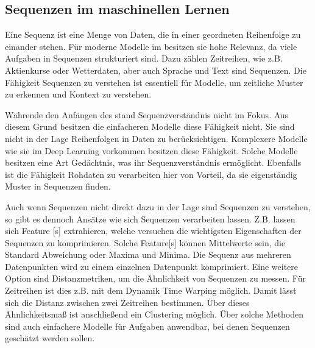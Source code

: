 \subsection{Sequenzen im maschinellen Lernen}
Eine Sequenz ist eine Menge von Daten, die in einer geordneten Reihenfolge zu einander stehen. Für moderne Modelle im  besitzen sie hohe Relevanz, da viele Aufgaben in Sequenzen strukturiert sind. Dazu zählen Zeitreihen, wie z.B. Aktienkurse oder Wetterdaten, aber auch Sprache und Text sind Sequenzen. Die Fähigkeit Sequenzen zu verstehen ist essentiell für Modelle, um zeitliche Muster zu erkennen und Kontext zu verstehen. \par

Währende den Anfängen des  stand Sequenzverständnis nicht im Fokus. Aus diesem Grund besitzen die einfacheren Modelle diese Fähigkeit nicht. Sie sind nicht in der Lage Reihenfolgen in Daten zu berücksichtigen. Komplexere Modelle wie sie im \gls{Deep Learning} vorkommen besitzen diese Fähigkeit. Solche Modelle besitzen eine Art Gedächtnis, was ihr Sequenzverständnis ermöglicht. Ebenfalls ist die Fähigkeit Rohdaten zu verarbeiten hier von Vorteil, da sie eigenständig Muster in Sequenzen finden.\par

Auch wenn Sequenzen nicht direkt dazu in der Lage sind Sequenzen zu verstehen, so gibt es dennoch Ansätze wie sich Sequenzen verarbeiten lassen. Z.B. lassen sich \gls{Feature} [s] extrahieren, welche versuchen die wichtigsten Eigenschaften der Sequenzen zu komprimieren. Solche \gls{Feature}[s] können Mittelwerte sein, die Standard Abweichung oder Maxima und Minima. Die Sequenz aus mehreren Datenpunkten wird zu einem einzelnen Datenpunkt komprimiert. Eine weitere Option sind Distanzmetriken, um die Ähnlichkeit von Sequenzen zu messen. Für Zeitreihen ist dies z.B. mit dem Dynamik Time Warping möglich. Damit lässt sich die Distanz zwischen zwei Zeitreihen bestimmen. Über dieses Ähnlichkeitsmaß ist anschließend ein Clustering möglich. Über solche Methoden sind auch einfachere Modelle für Aufgaben anwendbar, bei denen Sequenzen geschätzt werden sollen.